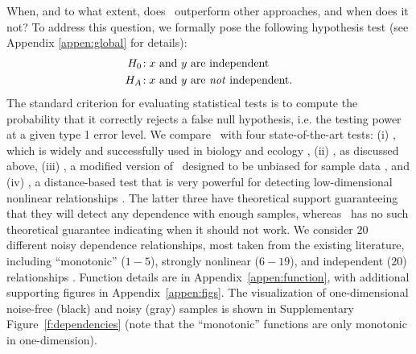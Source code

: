 \documentclass[11pt]{extarticle}
\begin{document}
When, and to what extent, does \Mgc~outperform other approaches, and when does it not?
To address this question, we formally pose the following hypothesis test (see Appendix \ref{appen:global} for details):
\begin{align*}
H_0\!:& \; x \text{ and } y \text{ are independent} \\
H_A\!:& \; x \text{ and } y \text{ are \emph{not} independent}.
\end{align*}
The standard criterion for evaluating statistical tests is to compute the probability that it correctly rejects a false null hypothesis, i.e. the testing power at a given type 1 error level.
We compare \Mgc~with four state-of-the-art tests:
(i) \Mantel, which is widely and successfully used in biology and ecology \cite{Mantel1967},
(ii) \Dcorr, as discussed above,
(iii) \Mcorr, a modified version of \Dcorr~designed to be unbiased for sample data \cite{SzekelyRizzo2013a}, and
(iv) \Hhg, a distance-based test that is very powerful for detecting low-dimensional nonlinear relationships \cite{HellerGorfine2013}.
The latter three have theoretical support guaranteeing that they will detect any dependence with enough samples, whereas \Mantel~has no such theoretical guarantee indicating when it should not work.
We consider $20$ different noisy dependence relationships, most taken from the existing literature, including  ``monotonic'' %
($1-5$), strongly nonlinear ($6-19$), and independent ($20$) relationships \cite{SzekelyRizzoBakirov2007, SimonTibshirani2012, GorfineHellerHeller2012, HellerGorfine2013, SzekelyRizzo2013a}.
Function details are in Appendix~\ref{appen:function}, with additional supporting figures in Appendix~\ref{appen:figs}.
 The visualization of one-dimensional noise-free (black) and noisy (gray) samples is shown in Supplementary Figure~\ref{f:dependencies}
(note that the ``monotonic'' functions are only monotonic in one-dimension).
\end{document}

